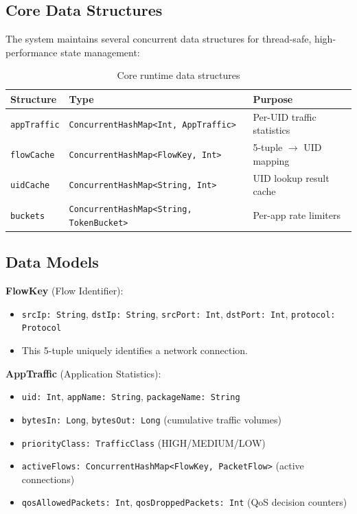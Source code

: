 \subsection{Core Data Structures}

The system maintains several concurrent data structures for thread-safe, high-performance state management:

\begin{table}[H]
\centering
\caption{Core runtime data structures}
\label{tab:data_structures}
\begin{tabular}{@{}p{3cm}p{5cm}p{5cm}@{}}
\toprule
\textbf{Structure} & \textbf{Type} & \textbf{Purpose} \\
\midrule
\texttt{appTraffic}  & \texttt{ConcurrentHashMap<Int, AppTraffic>} & Per-UID traffic statistics \\
\texttt{flowCache}   & \texttt{ConcurrentHashMap<FlowKey, Int>}    & 5-tuple $\rightarrow$ UID mapping \\
\texttt{uidCache}    & \texttt{ConcurrentHashMap<String, Int>}     & UID lookup result cache \\
\texttt{buckets}     & \texttt{ConcurrentHashMap<String, TokenBucket>} & Per-app rate limiters \\
\bottomrule
\end{tabular}
\end{table}

\subsection{Data Models}

\textbf{FlowKey} (Flow Identifier):
\begin{itemize}
    \item \texttt{srcIp: String}, \texttt{dstIp: String}, \texttt{srcPort: Int}, \texttt{dstPort: Int}, \texttt{protocol: Protocol}
    \item This 5-tuple uniquely identifies a network connection.
\end{itemize}

\textbf{AppTraffic} (Application Statistics):
\begin{itemize}
    \item \texttt{uid: Int}, \texttt{appName: String}, \texttt{packageName: String}
    \item \texttt{bytesIn: Long}, \texttt{bytesOut: Long} (cumulative traffic volumes)
    \item \texttt{priorityClass: TrafficClass} (HIGH/MEDIUM/LOW)
    \item \texttt{activeFlows: ConcurrentHashMap<FlowKey, PacketFlow>} (active connections)
    \item \texttt{qosAllowedPackets: Int}, \texttt{qosDroppedPackets: Int} (QoS decision counters)
\end{itemize}


